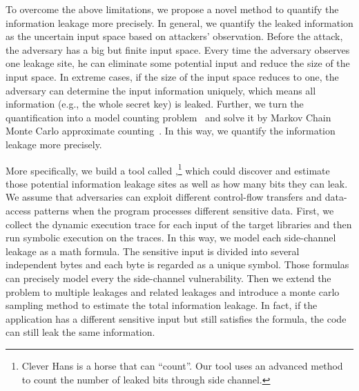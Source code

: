 To overcome the above limitations, we propose a novel method
to quantify the information leakage more precisely. 
In general, we quantify the leaked information as the uncertain input space based on attackers' observation.
Before the attack, the adversary has a big but finite input space.
Every time the adversary observes one leakage site, he can eliminate some potential input and
reduce the size of the input space. 
In extreme cases, if the size of the input space reduces to one, 
the adversary can determine the input information uniquely, which means all information
(e.g., the whole secret key) is leaked. 
Further, we turn the quantification into a model counting problem~\cite{bibid} 
and solve it by Markov Chain Monte Carlo approximate counting~\cite{bibid}. 
In this way, we quantify the information leakage more precisely.


More specifically, we build a tool called \tool{},\footnote{Clever Hans is a horse that can ``count''.
  Our tool uses an advanced method to count the number of leaked bits through side channel.}
which could discover and estimate those potential information leakage sites 
as well as how many bits they can leak. 
We assume that adversaries can exploit different control-flow transfers and data-access patterns when 
the program processes different sensitive data. 
First, we collect the dynamic execution trace for each input of the target libraries 
and then run symbolic execution on the traces. 
In this way, we model each side-channel leakage as a math formula. 
The sensitive input is divided into several independent bytes and each byte is regarded as 
a unique symbol. Those formulas can precisely model every the side-channel vulnerability.
Then we extend the problem to multiple leakages and related leakages
and introduce a monte carlo sampling method to estimate the total information leakage.
In fact, if the application has a different sensitive input but still satisfies the formula, 
the code can still leak the same information. 


